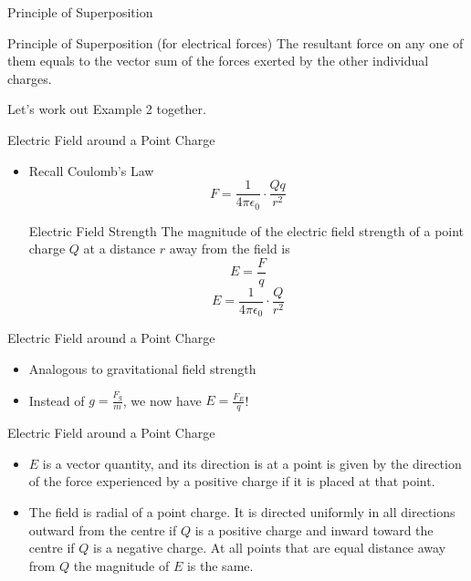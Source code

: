 \documentclass{beamer}
\begin{document}
\begin{frame}{Principle of Superposition}
\begin{block}{Principle of Superposition (for electrical forces)}
The resultant force on any one of them equals to the vector sum of the forces exerted by the other individual charges.
\end{block}

Let's work out Example 2 together.
\end{frame}

\begin{frame}{Electric Field around a Point Charge}{}
  \begin{itemize}
  \item Recall Coulomb's Law
\[F=\frac{1}{4\pi \epsilon_0} \cdot \frac{Qq}{r^2} \]
\begin{block}{Electric Field Strength}
The magnitude of the electric field strength of a point charge \(Q\) at a distance \(r\) away from the field is
\[E=\frac{F}{q}\]
\[E=\frac{1}{4\pi \epsilon_0} \cdot \frac{Q}{r^2}\]
\end{block}
  \end{itemize}
\end{frame}

\begin{frame}{Electric Field around a Point Charge}{}
  \begin{itemize}
  \item Analogous to gravitational field strength
  \item Instead of \(g=\frac{F_g}{m}\), we now have \(E=\frac{F_E}{q}\)!
  \end{itemize}
\end{frame}

\begin{frame}{Electric Field around a Point Charge}{}
  \begin{itemize}
  \item \(E\) is a vector quantity, and its direction is at a point is given by the direction of the force experienced by a positive charge if it is placed at that point.
  \item The field is radial of a point charge. It is directed uniformly in all directions outward from the centre if \(Q\) is a positive charge and inward toward the centre if \(Q\) is a negative charge. At all points that are equal distance away from \(Q\) the magnitude of \(E\) is the same.
  \end{itemize}
\end{frame}
\end{document}
